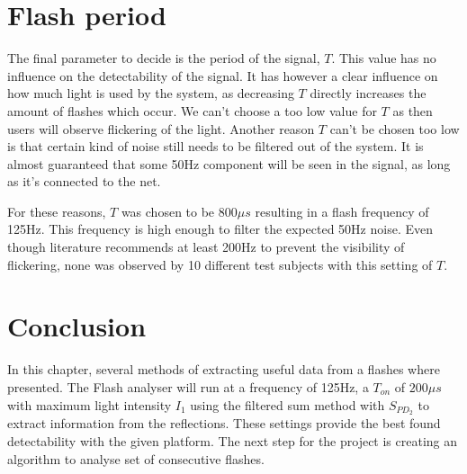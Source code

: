 \section{Flash period}
The final parameter to decide is the period of the signal, $T$. This value has no influence on the detectability of the signal. It has however a clear influence on how much light is used by the system, as decreasing $T$ directly increases the amount of flashes which occur. We can't choose a too low value for $T$ as then users will observe flickering of the light. Another reason $T$ can't be chosen too low is that certain kind of noise still needs to be filtered out of the system. It is almost guaranteed that some 50Hz component will be seen in the signal, as long as it's connected to the net. 

For these reasons, $T$ was chosen to be 800$\mu s$ resulting in a flash frequency of 125Hz. This frequency is high enough to filter the expected 50Hz noise. Even though literature recommends at least 200Hz to prevent the visibility of flickering, none was observed by 10 different test subjects with this setting of $T$.

\section{Conclusion}
In this chapter, several methods of extracting useful data from a flashes where presented. 
The Flash analyser will run at a frequency of 125Hz, a $T_{on}$ of $200\mu s$ with maximum light intensity $I_1$ using the filtered sum method with $S_{PD_2}$ to extract information from the reflections. These settings provide the best found detectability with the given platform. The next step for the project is creating an algorithm to analyse set of consecutive flashes.